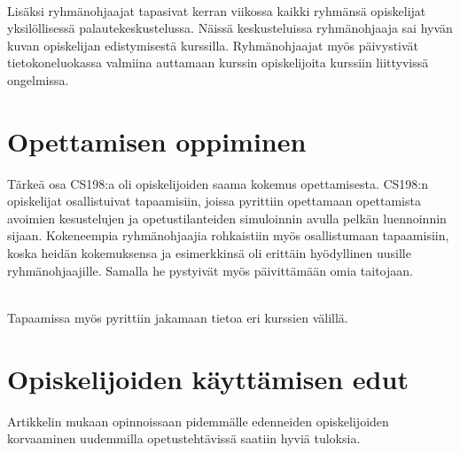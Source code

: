 \documentclass[finnish]{tktltiki2}
\theoremstyle{definition}
\theoremstyle{remark}
\begin{document}
\\

Lisäksi ryhmänohjaajat tapasivat kerran viikossa kaikki ryhmänsä opiskelijat yksilöllisessä palautekeskustelussa. Näissä keskusteluissa ryhmänohjaaja sai hyvän kuvan opiskelijan edistymisestä kurssilla. Ryhmänohjaajat myös päivystivät tietokoneluokassa valmiina auttamaan kurssin opiskelijoita kurssiin liittyvissä ongelmissa.





\section{Opettamisen oppiminen}

Tärkeä osa CS198:a oli opiskelijoiden saama kokemus opettamisesta. CS198:n opiskelijat osallistuivat tapaamisiin, joissa pyrittiin opettamaan opettamista avoimien kesustelujen ja opetustilanteiden simuloinnin avulla pelkän luennoinnin sijaan. Kokeneempia ryhmänohjaajia rohkaistiin myös osallistumaan tapaamisiin, koska heidän kokemuksensa ja esimerkkinsä oli erittäin hyödyllinen uusille ryhmänohjaajille. Samalla he pystyivät myös päivittämään omia taitojaan. 

\\

Tapaamissa myös pyrittiin jakamaan tietoa eri kurssien välillä.


\section{Opiskelijoiden käyttämisen edut}

Artikkelin mukaan opinnoissaan pidemmälle edenneiden opiskelijoiden korvaaminen uudemmilla opetustehtävissä saatiin hyviä tuloksia.  





\end{document}
